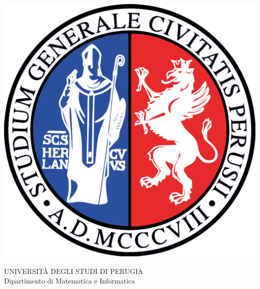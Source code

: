 \begin{titlepage}
   \begin{center}

        \begin{minipage}[t]{0.1\textwidth}
            \vspace{-15pt}
            \includegraphics[width=\linewidth]{imgs/unipg.png}
        \end{minipage}
        \begin{minipage}[t]{0.7\textwidth}
            \begin{center}
                UNIVERSITÀ DEGLI STUDI DI PERUGIA\\
            Dipartimento di Matematica e Informatica
        \end{center}
        \end{minipage}
        \begin{minipage}[t]{0.1\textwidth}
            \vspace{-15pt}

\end{minipage}
\end{center}
\end{titlepage}
